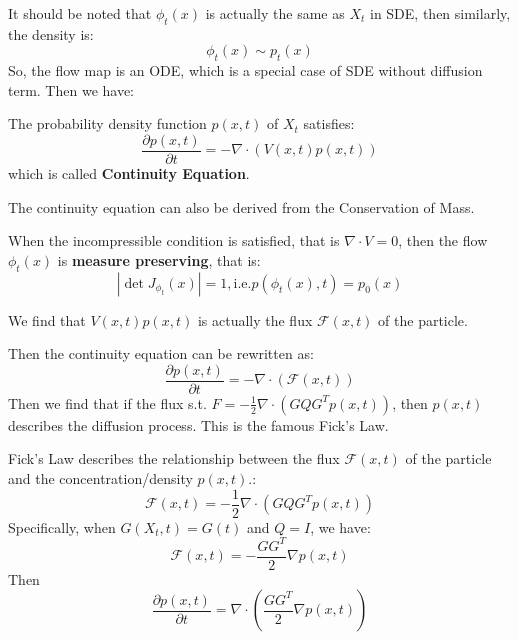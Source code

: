 It should be noted that $\phi_t(x)$ is actually the same as $X_t$ in SDE, then similarly, the density is:
\begin{equation}
    \phi_t(x) \sim p_t(x)
\end{equation}
So, the flow map is an ODE, which is a special case of SDE without diffusion term. Then we have:
\begin{theorem}
    The probability density function $p(x, t)$ of $X_t$ satisfies:
    \begin{equation}
        \frac{\partial p(x, t)}{\partial t} = -\nabla\cdot\left(V(x, t)p(x, t)\right)
    \end{equation}
    which is called \textbf{Continuity Equation}.
\end{theorem}
\begin{remark}
    The continuity equation can also be derived from the Conservation of Mass. 
\end{remark}

\begin{theorem}
    When the incompressible condition is satisfied, that is $\nabla\cdot V=0$, then the flow $\phi_t(x)$ is \textbf{measure preserving}, that is:
    \begin{equation}
        \left|\det J_{\phi_t}(x)\right|=1, \text{i.e.}p(\phi_t(x), t) = p_0(x)
    \end{equation}
\end{theorem}

\begin{definition}[Flux]
    We find that $V(x, t)p(x, t)$ is actually the flux $\mathcal{F}(x, t)$ of the particle.
\end{definition}
Then the continuity equation can be rewritten as:
\begin{equation}
    \frac{\partial p(x, t)}{\partial t} = -\nabla\cdot\left(\mathcal{F}(x, t)\right)
\end{equation}
Then we find that if the flux s.t. $F = -\frac{1}{2}\nabla\cdot\left(GQG^Tp(x, t)\right)$, then $p(x, t)$ describes the diffusion process. This is the famous Fick's Law.
\begin{theorem}
    Fick's Law describes the relationship between the flux $\mathcal{F}(x, t)$ of the particle and the concentration/density $p(x, t)$.:
    \begin{equation}
        \mathcal{F}(x, t) = -\frac{1}{2}\nabla\cdot\left(GQG^Tp(x, t)\right)
    \end{equation}
    Specifically, when $G(X_t, t)=G(t)$ and $Q=I$, we have:
    \begin{equation}
        \mathcal{F}(x, t) = -\frac{GG^T}{2}\nabla p(x, t)
    \end{equation}
    Then 
    \begin{equation}
        \frac{\partial p(x, t)}{\partial t} = \nabla \cdot\left(\frac{GG^T}{2}\nabla p(x, t)\right)
    \end{equation}
\end{theorem}
